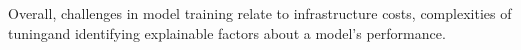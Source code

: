 \DIFdelbegin %

\DIFdelend Overall, challenges in model training relate to infrastructure costs, complexities of tuning\DIFaddbegin \DIFadd{, }\DIFaddend and identifying explainable factors about a model's performance.

\DIFaddbegin 

